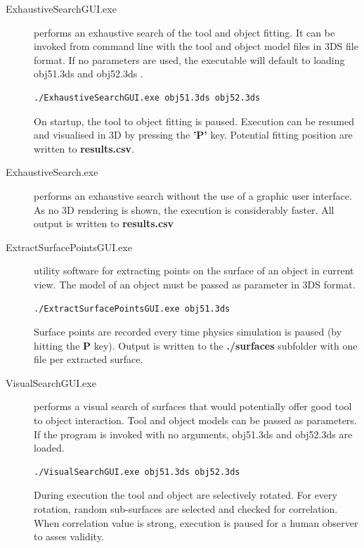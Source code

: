 \documentclass[
    a4paper,
    man,
    floatsintext,
    british
]{apa6}
\begin{document}
\begin{description}

  \item [ExhaustiveSearchGUI.exe] performs an exhaustive search of the tool and object fitting. It can be invoked from command line with the tool and object model files 	in 3DS file format. If no parameters are used, the executable will default to loading obj51.3ds and obj52.3ds .

    \begin{lstlisting}[language=bash]
  ./ExhaustiveSearchGUI.exe obj51.3ds obj52.3ds
    \end{lstlisting}

    On startup, the tool to object fitting is paused. Execution can be resumed and visualised in 3D by pressing the \textbf{'P'} key.
    Potential fitting position are written to \textbf{results.csv}.

  \item [ExhaustiveSearch.exe] performs an exhaustive search without the use of a graphic user interface. As no 3D rendering is shown, the execution is considerably faster. All output is written to \textbf{results.csv}

  \item [ExtractSurfacePointsGUI.exe] utility software for extracting points on the surface of an object in current view. The model of an object must be passed as parameter in 3DS format. 

    \begin{lstlisting}[language=bash]
  ./ExtractSurfacePointsGUI.exe obj51.3ds
    \end{lstlisting}

    Surface points are recorded every time physics simulation is paused (by hitting the \textbf{P} key).
    Output is written to the \textbf{./surfaces} subfolder with one file per extracted surface.   

  \item [VisualSearchGUI.exe] performs a visual search of surfaces that would potentially offer good tool to object interaction. Tool and object models can be passed as parameters. If the program is invoked with no arguments, obj51.3ds and obj52.3ds are loaded.
    
    \begin{lstlisting}[language=bash]
  ./VisualSearchGUI.exe obj51.3ds obj52.3ds
    \end{lstlisting}

    During execution the tool and object are selectively rotated. For every rotation, random sub-surfaces are selected and checked for correlation.
    When correlation value is strong, execution is paused for a human observer to asses validity. 

\end{description}

\printbibliography
\end{document}
